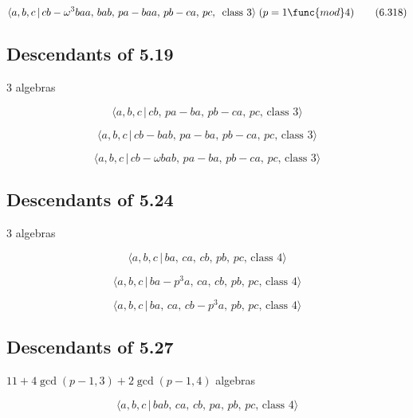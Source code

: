 \documentclass[10pt]{article}
\begin{document}
\begin{equation}
\langle a,b,c\,|\,cb-\omega ^3baa,\,bab,\,pa-baa,\,pb-ca,\,pc,\,\text{ class 
}3\rangle\;(p=1 \func{mod} 4)  \tag{6.318}
\end{equation}

\subsection{Descendants of 5.19}

3 algebras

\begin{equation}
\langle a,b,c\,|\,cb,\,pa-ba,\,pb-ca,\,pc,\,\text{class }3\rangle 
\tag{6.319}
\end{equation}

\begin{equation}
\langle a,b,c\,|\,cb-bab,\,pa-ba,\,pb-ca,\,pc,\,\text{class }3\rangle 
\tag{6.320}
\end{equation}

\begin{equation}
\langle a,b,c\,|\,cb-\omega bab,\,pa-ba,\,pb-ca,\,pc,\,\text{class }3\rangle
\tag{6.321}
\end{equation}

\subsection{Descendants of 5.24}

3 algebras

\begin{equation}
\langle a,b,c\,|\,ba,\,ca,\,cb,\,pb,\,pc,\,\text{class }4\rangle  \tag{6.322}
\end{equation}

\begin{equation}
\langle a,b,c\,|\,ba-p^3a,\,ca,\,cb,\,pb,\,pc,\,\text{class }4\rangle 
\tag{6.323}
\end{equation}

\begin{equation}
\langle a,b,c\,|\,ba,\,ca,\,cb-p^3a,\,pb,\,pc,\,\text{class }4\rangle 
\tag{6.324}
\end{equation}

\subsection{Descendants of 5.27}

$11+4\gcd (p-1,3)+2\gcd (p-1,4)$ algebras

\begin{equation}
\langle a,b,c\,|\,bab,\,ca,\,cb,\,pa,\,pb,\,pc,\,\text{class }4\rangle 
\tag{6.325}
\end{equation}
\end{document}
